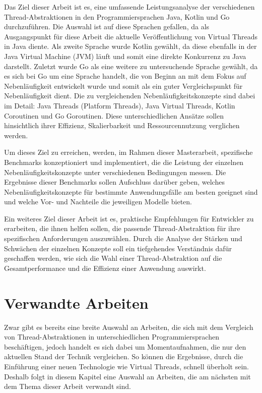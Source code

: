 \documentclass[fontsize=12pt,paper=a4,twoside=semi,parskip=half-,headsepline,headinclude]{scrreprt}
\begin{document}
Das Ziel dieser Arbeit ist es, eine umfassende Leistungsanalyse der verschiedenen Thread-Abstraktionen in den Programmiersprachen Java, Kotlin und Go durchzuführen. Die Auswahl ist auf diese Sprachen gefallen, da als Ausgangspunkt für diese Arbeit die aktuelle Veröffentlichung von Virtual Threads in Java diente. Als zweite Sprache wurde Kotlin gewählt, da diese ebenfalls in der Java Virtual Machine (JVM) läuft und somit eine direkte Konkurrenz zu Java darstellt. Zuletzt wurde Go als eine weitere zu untersuchende Sprache gewählt, da es sich bei Go um eine Sprache handelt, die von Beginn an mit dem Fokus auf Nebenläufigkeit entwickelt wurde und somit als ein guter Vergleichspunkt für Nebenläufigkeit dient. Die zu vergleichenden Nebenläufigkeitskonzepte sind dabei im Detail: Java Threads (Platform Threads), Java Virtual Threads, Kotlin Coroutinen und Go Goroutinen. Diese unterschiedlichen Ansätze sollen hinsichtlich ihrer Effizienz, Skalierbarkeit und Ressourcennutzung verglichen werden.

Um dieses Ziel zu erreichen, werden, im Rahmen dieser Masterarbeit, spezifische Benchmarks konzeptioniert und implementiert, die die Leistung der einzelnen Neben\-läufig\-keits\-konzepte unter verschiedenen Bedingungen messen. Die Ergebnisse dieser Benchmarks sollen Aufschluss darüber geben, welches Nebenläufigkeitskonzepte für bestimmte Anwendungsfälle am besten geeignet sind und welche Vor- und Nachteile die jeweiligen Modelle bieten.

Ein weiteres Ziel dieser Arbeit ist es, praktische Empfehlungen für Entwickler zu erarbeiten, die ihnen helfen sollen, die passende Thread-Abstraktion für ihre spezifischen Anforderungen auszuwählen. Durch die Analyse der Stärken und Schwächen der einzelnen Konzepte soll ein tiefgehendes Verständnis dafür geschaffen werden, wie sich die Wahl einer Thread-Abstraktion auf die Gesamtperformance und die Effizienz einer Anwendung auswirkt.

\section{Verwandte Arbeiten}

Zwar gibt es bereits eine breite Auswahl an Arbeiten, die sich mit dem Vergleich von Thread-Abstraktionen in unterschiedlichen Programmiersprachen beschäftigen, jedoch handelt es sich dabei um Momentaufnahmen, die nur den aktuellen Stand der Technik vergleichen. So können die Ergebnisse, durch die Einführung einer neuen Technologie wie Virtual Threads, schnell überholt sein. Deshalb folgt in diesem Kapitel eine Auswahl an Arbeiten, die am nächsten mit dem Thema dieser Arbeit verwandt sind.
\end{document}
